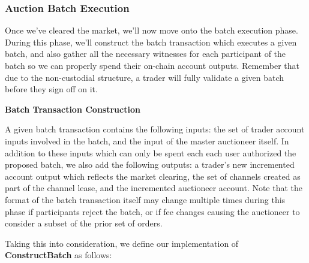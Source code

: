 \documentclass[10pt,a4paper]{article}
\theoremstyle{definition}
\begin{document}

\subsubsection{Auction Batch Execution}

Once we've cleared the market, we'll now move onto the batch execution phase.
During this phase, we'll construct the batch transaction which executes a given
batch, and also gather all the necessary witnesses for each participant of the
batch so we can properly spend their on-chain account outputs. Remember
that due to the non-custodial structure, a trader will fully validate a given
batch before they sign off on it.

\begin{center}
    \textbf{Batch Transaction Construction}
\end{center}

A given batch transaction contains the following inputs: the set of trader
account inputs involved in the batch, and the input of the master auctioneer
itself. In addition to these inputs which can only be spent each each user
authorized the proposed batch, we also add the following outputs: a trader's
new incremented account output which reflects the market clearing, the set of
channels created as part of the channel lease, and the incremented auctioneer
account. Note that the format of the batch transaction itself may change
multiple times during this phase if participants reject the batch, or if fee
changes causing the auctioneer to consider a subset of the prior set of orders.

Taking this into consideration, we define our implementation of
\textbf{ConstructBatch} as follows:
\begin{pcvstack}[boxed,center, space=1em]
\end{pcvstack}
\end{document}
